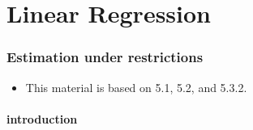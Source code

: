 
\part*{Linear Regression}%

\section{Estimation under restrictions}

\begin{itemize}
\item This material is based on \citet{Gre_2011} 5.1, 5.2, and 5.3.2.
\end{itemize}

\subsection{introduction}

